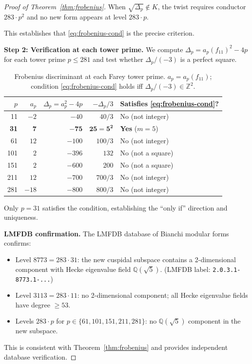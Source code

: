 \begin{proof}[Proof of Theorem~\ref{thm:frobenius}]
When $\sqrt{\Delta_p} \notin K$, the twist requires conductor $283 \cdot p^2$
and no new form appears at level $283 \cdot p$.

This establishes that \eqref{eq:frobenius-cond} is the precise criterion.

\medskip

\textbf{Step 2: Verification at each tower prime.}
We compute $\Delta_p = a_p(f_{11})^2 - 4p$ for each tower prime
$p \leq 281$ and test whether $\Delta_p / (-3)$ is a perfect square.

\begin{table}[h]
\centering
\caption{Frobenius discriminant at each Farey tower prime.
$a_p = a_p(f_{11})$; condition \eqref{eq:frobenius-cond} holds iff
$\Delta_p/(-3) \in \mathbb{Z}^2$.}
\label{tab:frobenius}
\begin{tabular}{rrrrl}
\toprule
$p$ & $a_p$ & $\Delta_p = a_p^2 - 4p$ & $-\Delta_p/3$ & Satisfies \eqref{eq:frobenius-cond}? \\
\midrule
11  & $-2$  & $-40$  & $40/3$      & No (not integer)  \\
\textbf{31}  & $\mathbf{7}$   & $\mathbf{-75}$  & $\mathbf{25 = 5^2}$ & \textbf{Yes} ($m = 5$) \\
61  & $12$  & $-100$ & $100/3$     & No (not integer)  \\
101 & $2$   & $-396$ & $132$       & No (not a square) \\
151 & $2$   & $-600$ & $200$       & No (not a square) \\
211 & $12$  & $-700$ & $700/3$     & No (not integer)  \\
281 & $-18$ & $-800$ & $800/3$     & No (not integer)  \\
\bottomrule
\end{tabular}
\end{table}

Only $p = 31$ satisfies the condition, establishing the ``only if''
direction and uniqueness.

\medskip

\textbf{LMFDB confirmation.}
The LMFDB \cite{lmfdb} database of Bianchi modular forms confirms:
\begin{itemize}
  \item Level $8773 = 283 \cdot 31$: the new cuspidal subspace contains
        a 2-dimensional component with Hecke eigenvalue field
        $\mathbb{Q}(\sqrt{5})$. \hfill (LMFDB label: \texttt{2.0.3.1-8773.1-...})
  \item Level $3113 = 283 \cdot 11$: no 2-dimensional component; all
        Hecke eigenvalue fields have degree $\geq 53$.
  \item Levels $283 \cdot p$ for $p \in \{61, 101, 151, 211, 281\}$:
        no $\mathbb{Q}(\sqrt{5})$ component in the new subspace.
\end{itemize}
This is consistent with Theorem~\ref{thm:frobenius} and provides
independent database verification.
\end{proof}


